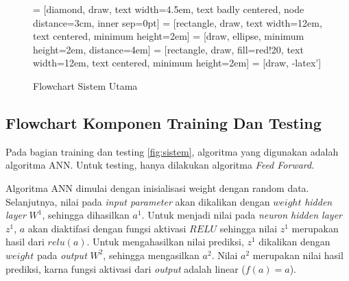 \begin{figure}[ht]
  \caption{Flowchart Sistem Utama}
  \begin{center}
     = [diamond, draw, 
        text width=4.5em, text badly centered, node distance=3cm, inner sep=0pt]
     = [rectangle, draw, 
        text width=12em, text centered, minimum height=2em]
     = [draw, ellipse, minimum height=2em, distance=4em]
     = [rectangle, draw, fill=red!20, 
        text width=12em, text centered, minimum height=2em]
     = [draw, -latex']
        
  \end{center}
\end{figure}
\FloatBarrier

\subsection{Flowchart Komponen Training Dan Testing}
\label{FlowChartTraining}
Pada bagian training dan testing \ref{fig:sistem}, algoritma yang digunakan adalah algoritma ANN. Untuk testing, hanya dilakukan algoritma \emph{Feed Forward}.

Algoritma ANN dimulai dengan inisialisasi weight dengan random data. Selanjutnya, nilai pada \emph{input parameter} akan dikalikan dengan $weight$ \emph{hidden layer} $W^1$, sehingga dihasilkan $a^1$. Untuk menjadi nilai pada \emph{neuron hidden layer} $z^1$, $a$ akan diaktifasi dengan fungsi aktivasi $RELU$ sehingga nilai $z^1$ merupakan hasil dari $relu(a)$. Untuk mengahasilkan nilai prediksi, $z^1$ dikalikan dengan $weight$ pada \emph{output} $W^2$, sehingga mengasilkan $a^2$. Nilai $a^2$ merupakan nilai hasil prediksi, karna fungsi aktivasi dari \emph{output} adalah linear ($f(a) = a$).

